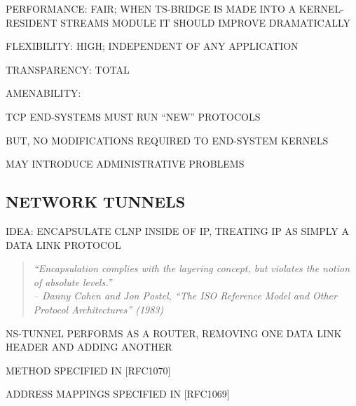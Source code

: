 \begin{bwslide}

\begin{nrtc}
\item	PERFORMANCE: FAIR; WHEN TS-BRIDGE IS MADE INTO A KERNEL-RESIDENT
	STREAMS MODULE IT SHOULD IMPROVE DRAMATICALLY

\item	FLEXIBILITY: HIGH; INDEPENDENT OF ANY APPLICATION

\item	TRANSPARENCY: TOTAL

\item	AMENABILITY:
    \begin{nrtc}
    \item	TCP END-SYSTEMS MUST RUN ``NEW'' PROTOCOLS
	\begin{nrtc}
	\item	BUT, NO MODIFICATIONS REQUIRED TO END-SYSTEM KERNELS
	\end{nrtc}

    \item	MAY INTRODUCE ADMINISTRATIVE PROBLEMS
    \end{nrtc}
\end{nrtc}
\end{bwslide}


\begin{bwslide}
\part*	{NETWORK TUNNELS}\bf

\begin{nrtc}
\item	IDEA: ENCAPSULATE CLNP INSIDE OF IP, TREATING IP AS SIMPLY A DATA LINK
	PROTOCOL
\begin{quote}\em
``Encapsulation complies with the layering concept, but violates the notion
of absolute levels.''\\ \raggedleft
-- Danny Cohen and Jon Postel, ``The ISO Reference Model and Other Protocol
Architectures'' (1983)
\end{quote}

\item	NS-TUNNEL PERFORMS AS A ROUTER, REMOVING ONE DATA LINK HEADER AND
	ADDING ANOTHER

\item	METHOD SPECIFIED IN [RFC1070]

\item	ADDRESS MAPPINGS SPECIFIED IN [RFC1069] 
\end{nrtc}
\end{bwslide}


